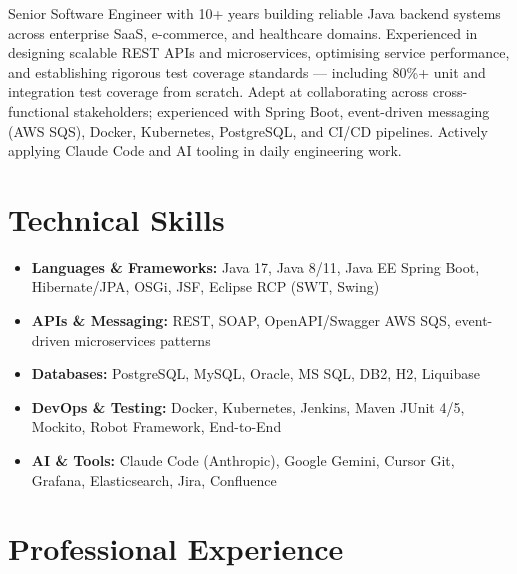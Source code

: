 \documentclass[10pt,a4paper,sans]{moderncv}
\begin{document}
\makecvtitle
\vspace{-10pt}

\small{Senior Software Engineer with 10+ years building reliable Java backend systems across enterprise SaaS, e-commerce, and healthcare domains. Experienced in designing scalable REST APIs and microservices, optimising service performance, and establishing rigorous test coverage standards — including 80\%+ unit and integration test coverage from scratch. Adept at collaborating across cross-functional stakeholders; experienced with Spring Boot, event-driven messaging (AWS SQS), Docker, Kubernetes, PostgreSQL, and CI/CD pipelines. Actively applying Claude Code and AI tooling in daily engineering work.}

\vspace{2pt}

\section{Technical Skills}
\vspace{1pt}
\begin{itemize}
  \item \textbf{Languages \& Frameworks:} Java 17, Java 8/11, Java EE \textbar{} Spring Boot, Hibernate/JPA, OSGi, JSF, Eclipse RCP (SWT, Swing)
  \item \textbf{APIs \& Messaging:} REST, SOAP, OpenAPI/Swagger \textbar{} AWS SQS, event-driven microservices patterns
  \item \textbf{Databases:} PostgreSQL, MySQL, Oracle, MS SQL, DB2, H2, Liquibase
  \item \textbf{DevOps \& Testing:} Docker, Kubernetes, Jenkins, Maven \textbar{} JUnit 4/5, Mockito, Robot Framework, End-to-End
  \item \textbf{AI \& Tools:} Claude Code (Anthropic), Google Gemini, Cursor \textbar{} Git, Grafana, Elasticsearch, Jira, Confluence
\end{itemize}

\section{Professional Experience}
\vspace{1pt}
\end{document}
